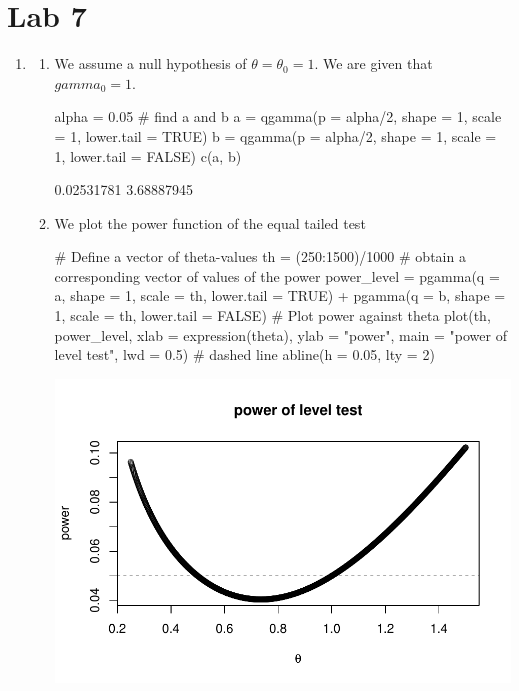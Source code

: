 \documentclass[12pt, a4paper]{article}\usepackage[]{graphicx}\usepackage[]{color}
\makeatletter
\def\maxwidth{ %
  \ifdim\Gin@nat@width>\linewidth
    \linewidth
  \else
    \Gin@nat@width
  \fi
}
\makeatother
\begin{document}


\pagestyle{default}
\thispagestyle{empty}

\newpage
\setcounter{page}{1}
\tableofcontents
\newpage
\section{Lab 7}
\begin{enumerate}[label={\bfseries\arabic*.}]
  \item 
  \begin{enumerate}[label={(\alph*)}]
    \item We assume a null hypothesis of $\theta = \theta_0 = 1$. We are given that $gamma_0 = 1$. 
\begin{Schunk}
\begin{Sinput}
alpha = 0.05
# find a and b
a = qgamma(p = alpha/2, shape = 1, scale = 1, lower.tail = TRUE)
b = qgamma(p = alpha/2, shape = 1, scale = 1, lower.tail = FALSE)
c(a, b)
\end{Sinput}
\begin{Soutput}
[1] 0.02531781 3.68887945
\end{Soutput}
\end{Schunk}
  \item We plot the power function of the equal tailed test
\begin{Schunk}
\begin{Sinput}
# Define a vector of theta-values
th = (250:1500)/1000
# obtain a corresponding vector of values of the power
power_level = pgamma(q = a, shape = 1, scale = th, lower.tail = TRUE) + pgamma(q = b, shape = 1, scale = th,
    lower.tail = FALSE)
# Plot power against theta
plot(th, power_level, xlab = expression(theta), ylab = "power", main = "power of level test", lwd = 0.5)
# dashed line
abline(h = 0.05, lty = 2)
\end{Sinput}


{\centering \includegraphics[width=\maxwidth]{figure/unnamed-chunk-3-1} 

}
\end{Schunk}
\end{enumerate}
\end{enumerate}
\end{document}
